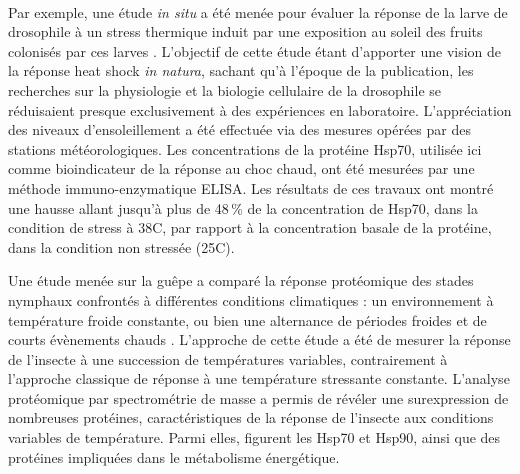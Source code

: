 		\paragraph*{}
		Par exemple, une étude \textit{in situ} a été menée pour évaluer la réponse de la larve de drosophile à un stress thermique induit par une exposition au soleil des fruits colonisés par ces larves \cite{feder1997}.
		L'objectif de cette étude étant d'apporter une vision de la réponse heat shock \textit{in natura}, sachant qu'à l'époque de la publication, les recherches sur la physiologie et la biologie cellulaire de la drosophile se réduisaient presque exclusivement à des expériences en laboratoire.
		L'appréciation des niveaux d'ensoleillement a été effectuée via des mesures opérées par des stations météorologiques.
		Les concentrations de la protéine Hsp70, utilisée ici comme bioindicateur de la réponse au choc chaud, ont été mesurées par une méthode immuno-enzymatique ELISA. 
		Les résultats de ces travaux ont montré une hausse allant jusqu'à plus de 48\,\% de la concentration de Hsp70, dans la condition de stress à 38\textdegree{}C, par rapport à la concentration basale de la protéine, dans la condition non stressée (25\textdegree{}C).

		Une étude menée sur la guêpe  a comparé la réponse protéomique des stades nymphaux confrontés à différentes conditions climatiques : un environnement à température froide constante, ou bien une alternance de périodes froides et de courts évènements chauds \cite{colinet2007}.
		L'approche de cette étude a été de mesurer la réponse de l'insecte à une succession de températures variables, contrairement à l'approche classique de réponse à une température stressante constante. 
		L'analyse protéomique par spectrométrie de masse a  permis de révéler une surexpression de nombreuses protéines, caractéristiques de la réponse de l'insecte aux conditions variables de température.
		Parmi elles, figurent les Hsp70 et Hsp90,
		ainsi que des protéines impliquées dans le métabolisme énergétique.


